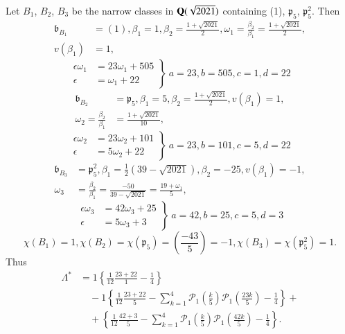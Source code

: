 Let $B_{1}$, $B_{2}$, $B_{3}$ be the narrow classes in
$\mathbf{Q}(\sqrt{2021})$ containing (1), $\mathfrak{p}_{5}$,
$\mathfrak{p}^{2}_{5}$. Then
\begin{align*}
\mathfrak{b}_{B_{1}} &= (1),
\beta_{1}=1,\beta_{2}=\frac{1+\sqrt{2021}}{2},\omega_{1}=\frac{\beta_{2}}{\beta_{1}}=\frac{1+\sqrt{2021}}{2},\\
v(\beta_{1}) & =1,
\end{align*}
\begin{equation*}
\left.
\begin{aligned}
\epsilon\omega_{1} &= 23\omega_{1}+505\\
\epsilon &= \omega_{1}+22
\end{aligned}\right\} \ 
a=23, b=505, c=1, d=22
\end{equation*}
\begin{align*}
\mathfrak{b}_{B_{2}} &= \mathfrak{p}_{5},\beta_{1}=5,
\beta_{2}=\frac{1+\sqrt{2021}}{2},v(\beta_{1})=1,\\
\omega_{2}=\frac{\beta_{2}}{\beta_{1}} &= \frac{1+\sqrt{2021}}{10},
\end{align*}
\begin{equation*}
\left.
\begin{aligned}
\epsilon\omega_{2} &= 23\omega_{2}+101\\
\epsilon &= 5\omega_{2}+22
\end{aligned}\right\} \ a=23, b=101, c=5, d=22
\end{equation*}\pageoriginale
\begin{align*}
\mathfrak{b}_{B_{3}} &=
\mathfrak{p}^{2}_{5},\beta_{1}=\frac{1}{2}(39-\sqrt{2021}),
\beta_{2}=-25, v(\beta_{1})=-1,\\
\omega_{3} &=
\frac{\beta_{2}}{\beta_{1}}=\frac{-50}{39-\sqrt{2021}}=\frac{19+\omega_{1}}{5}, 
\end{align*}
\begin{equation*}
\left.
\begin{aligned}
\epsilon\omega_{3} &= 42\omega_{3}+25\\
\epsilon &= 5\omega_{3}+3
\end{aligned}\right\} \ a=42, b=25, c=5, d=3
\end{equation*}
$$
\chi(B_{1})=1,\chi(B_{2})=\chi(\mathfrak{p}_{5})=\left(\frac{-43}{5}\right)=-1,
\chi(B_{3})=\chi(\mathfrak{p}^{2}_{5})=1. 
$$
Thus
\begin{align*}
\Lambda^{\ast} &=
1\left\{\frac{1}{12}\frac{23+22}{1}-\frac{1}{4}\right\}\\
&\quad
-1\left\{\frac{1}{12}\frac{23+22}{5}-\sum^{4}_{k=1}\mathscr{P}_{1}\left(\frac{k}{5}\right)\mathscr{P}_{1}\left(\frac{23k}{5}\right)-\frac{1}{4}\right\}+\\
&\quad +\left\{\frac{1}{12}\frac{42+3}{5}-\sum^{4}_{k=1}\mathscr{P}_{1}\left(\frac{k}{5}\right)\mathscr{P}_{1}\left(\frac{42k}{5}\right)-\frac{1}{4}\right\}.
\end{align*}
